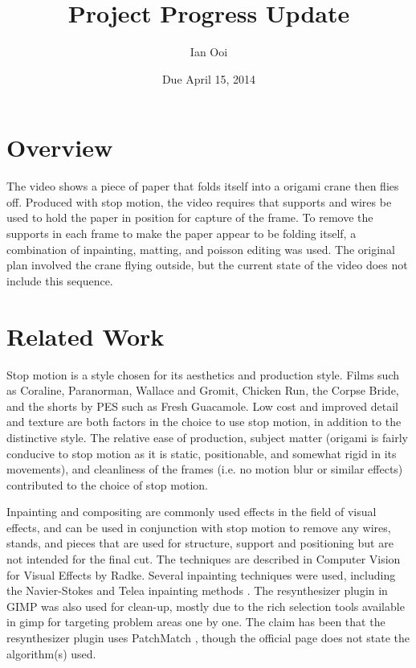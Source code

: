 \documentclass[12pt]{article}
\title{Project Progress Update}
\author{Ian Ooi}
\date{Due April 15, 2014}
\begin{document}
    \maketitle
    \section{Overview}
        The video shows a piece of paper that folds itself into a origami crane then flies off.  Produced with stop motion, the video requires that supports and wires be used to hold the paper in position for capture of the frame.  To remove the supports in each frame to make the paper appear to be folding itself, a combination of inpainting, matting, and poisson editing was used.  The original plan involved the crane flying outside, but the current state of the video does not include this sequence.  
    \section{Related Work}
        Stop motion is a style chosen for its aesthetics and production style.  Films such as Coraline, Paranorman, Wallace and Gromit, Chicken Run, the Corpse Bride, and the shorts by PES such as Fresh Guacamole.  Low cost and improved detail and texture are both factors in the choice to use stop motion, in addition to the distinctive style.  The relative ease of production, subject matter (origami is fairly conducive to stop motion as it is static, positionable, and somewhat rigid in its movements), and cleanliness of the frames (i.e. no motion blur or similar effects) contributed to the choice of stop motion.
        
        Inpainting and compositing are commonly used effects in the field of visual effects, and can be used in conjunction with stop motion to remove any wires, stands, and pieces that are used for structure, support and positioning but are not intended for the final cut.  The techniques are described in Computer Vision for Visual Effects by Radke.  Several inpainting techniques were used, including the Navier-Stokes and Telea inpainting methods \cite{ns, telea}.  The resynthesizer plugin in GIMP was also used for clean-up, mostly due to the rich selection tools available in gimp for targeting problem areas one by one.  The claim has been that the resynthesizer plugin uses PatchMatch \cite{patchmatch}, though the official page does not state the algorithm(s) used.
\end{document}
